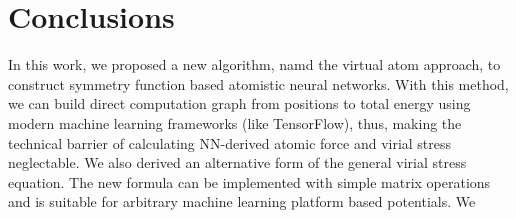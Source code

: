 \documentclass[preprint]{revtex4-2}
\begin{document}
% 
%
\section{Conclusions}
\label{section:conclusions}

In this work, we proposed a new algorithm, namd the virtual atom approach, 
to construct symmetry function based atomistic neural networks. With this 
method, we can build direct computation graph from positions to total energy 
using modern machine learning frameworks (like TensorFlow), thus, making the 
technical barrier of calculating NN-derived atomic force and virial stress  
neglectable. We also derived an alternative form of the general virial stress 
equation. The new formula can be implemented with simple matrix operations and 
is suitable for arbitrary machine learning platform based potentials. We 
\end{document}
